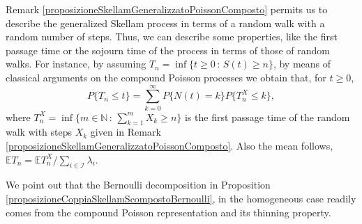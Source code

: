 \documentclass[12pt, twoside, english, headsepline]{article}
\newtheorem{lemma}[theorem]{Lemma}
\theoremstyle{definition} %
\newtheorem{remark}{Remark}[section] %
\numberwithin{equation}{section} %
\begin{document}
Remark \ref{proposizioneSkellamGeneralizzatoPoissonComposto} permits us to describe the generalized Skellam process in terms of a random walk with a random number of steps. Thus, we can describe some properties, like the first passage time or the sojourn time of the process in terms of those of random walks.
For instance, by assuming $T_n = \inf\{t\ge0\,:\,S(t)\ge n\}$, by means of classical arguments on the compound Poisson processes we obtain that, for $t\ge0$,
$$P\{T_n \le t\} =\sum_{k=0}^\infty P\{N(t) = k\}P\{T_n^{X} \le k\}, $$
where $T_n^X = \inf\{m\in\mathbb{N}\,:\,\sum_{k=1}^m X_k \ge n\}$ is the first passage time of the random walk with steps $X_k$ given in Remark \ref{proposizioneSkellamGeneralizzatoPoissonComposto}. Also the mean follows, $\mathbb{E} T_n = \mathbb{E} T_n^X /\sum_{i\in\mathcal{I}}\lambda_i$.

We point out that the Bernoulli decomposition in Proposition \ref{proposizioneCoppiaSkellamScompostoBernoulli}, in the homogeneous case readily comes from the compound Poisson representation and its thinning property.%
%
\end{document}
